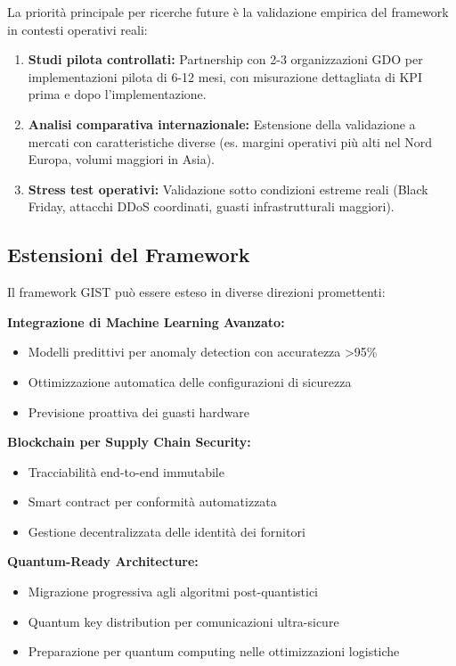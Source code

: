 La priorità principale per ricerche future è la validazione empirica del framework in contesti operativi reali:

\begin{enumerate}
\item \textbf{Studi pilota controllati:} Partnership con 2-3 organizzazioni GDO per implementazioni pilota di 6-12 mesi, con misurazione dettagliata di KPI prima e dopo l'implementazione.

\item \textbf{Analisi comparativa internazionale:} Estensione della validazione a mercati con caratteristiche diverse (es. margini operativi più alti nel Nord Europa, volumi maggiori in Asia).

\item \textbf{Stress test operativi:} Validazione sotto condizioni estreme reali (Black Friday, attacchi DDoS coordinati, guasti infrastrutturali maggiori).
\end{enumerate}

\subsection{\texorpdfstring{\textbf{Estensioni del Framework}}{5.7.2 - Estensioni del Framework}}
\label{subsec:5.7.2}

Il framework GIST può essere esteso in diverse direzioni promettenti:

\textbf{Integrazione di Machine Learning Avanzato:}
\begin{itemize}
\item Modelli predittivi per anomaly detection con accuratezza >95\%
\item Ottimizzazione automatica delle configurazioni di sicurezza
\item Previsione proattiva dei guasti hardware
\end{itemize}

\textbf{Blockchain per Supply Chain Security:}
\begin{itemize}
\item Tracciabilità end-to-end immutabile
\item Smart contract per conformità automatizzata
\item Gestione decentralizzata delle identità dei fornitori
\end{itemize}

\textbf{Quantum-Ready Architecture:}
\begin{itemize}
\item Migrazione progressiva agli algoritmi post-quantistici
\item Quantum key distribution per comunicazioni ultra-sicure
\item Preparazione per quantum computing nelle ottimizzazioni logistiche
\end{itemize}

